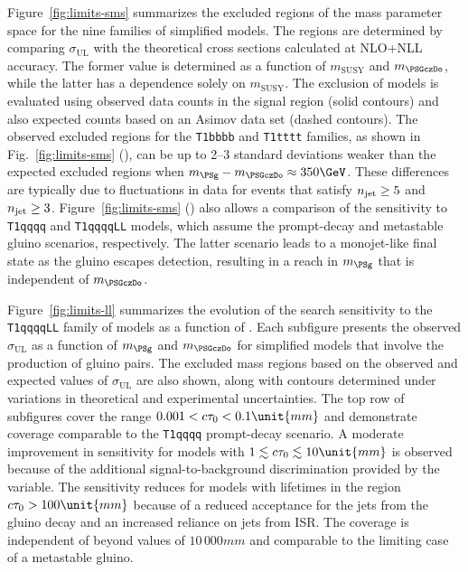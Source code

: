 Figure~\ref{fig:limits-sms} summarizes the excluded regions of the
mass parameter space for the nine families of simplified models. The
regions are determined by comparing $\sigma_\text{UL}$
with the theoretical cross sections calculated at NLO+NLL accuracy. 
The former value is determined as a function of $m_{\text{SUSY}}$ and
$m_{\PSGczDo}$, while the latter has a dependence solely on
$m_{\text{SUSY}}$. The exclusion of models is evaluated using observed
data counts in the signal region (solid contours) and also expected
counts based on an Asimov data set (dashed contours). 
%
The observed excluded regions for the \texttt{T1bbbb} and
\texttt{T1tttt} families, as shown in Fig.~\ref{fig:limits-sms}
(\cmsRight), can be up to 2--3 standard deviations weaker than the
expected excluded regions when $m_{\PSg} - m_{\PSGczDo} \approx
350\GeV$. These differences are typically due to fluctuations in data
for events that satisfy $n_{\text{jet}} \geq 5$ and $n_{\text{jet}} \geq
3$. Figure~\ref{fig:limits-sms} (\cmsRight) also allows a comparison
of the sensitivity to \texttt{T1qqqq} and \texttt{T1qqqqLL} models,
which assume the prompt-decay and metastable gluino scenarios,
respectively. The latter scenario leads to a monojet-like final state as
the gluino escapes detection, resulting in a reach in $m_\PSg$ that is
independent of $m_{\PSGczDo}$.

Figure~\ref{fig:limits-ll} summarizes the evolution of the search
sensitivity to the \texttt{T1qqqqLL} family of models as a function of
\ctau. Each subfigure presents the observed $\sigma_\text{UL}$ as a
function of $m_{\PSg}$ and $m_{\PSGczDo}$ for simplified models that
involve the production of gluino pairs. The excluded mass regions
based on the observed and expected values of $\sigma_\text{UL}$ are
also shown, along with contours determined under variations in
theoretical and experimental uncertainties. The top row of subfigures
cover the range $0.001 < \ctau < 0.1\unit{mm}$ and demonstrate
coverage comparable to the \texttt{T1qqqq} prompt-decay scenario. A
moderate improvement in sensitivity for models with $1 \lesssim \ctau
\lesssim 10\unit{mm}$ is observed because of the additional
signal-to-background discrimination provided by the \nb variable. The
sensitivity reduces for models with lifetimes in the region $\ctau >
100\unit{mm}$ because of a reduced acceptance for the jets from the
gluino decay and an increased reliance on jets from ISR. The coverage
is independent of \ctau beyond values of $10\,000\unit{mm}$ and
comparable to the limiting case of a metastable gluino. 

